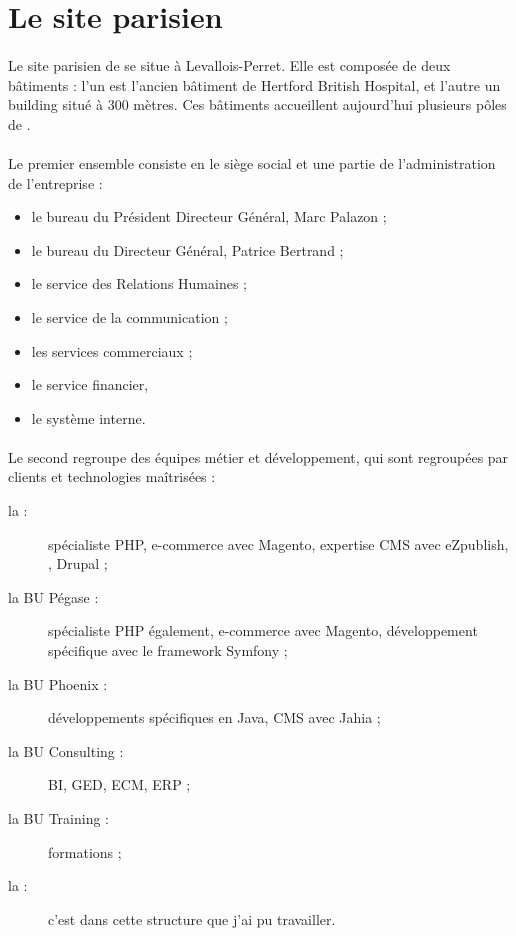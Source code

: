 \section{Le site parisien}

\paragraph{}
Le site parisien de \asmile{} se situe à Levallois-Perret.
Elle est composée de deux bâtiments : l'un est l'ancien bâtiment de Hertford British Hospital, et l'autre un building situé à 300 mètres.
Ces bâtiments accueillent aujourd'hui plusieurs pôles de \asmile{}.

\paragraph{}
Le premier ensemble consiste en le siège social et une partie de l'administration de l'entreprise :

\begin{itemize}
	\item le bureau du Président Directeur Général, Marc Palazon ;
	\item le bureau du Directeur Général, Patrice Bertrand ;
	\item le service des Relations Humaines ;
	\item le service de la communication ;
	\item les services commerciaux ;
	\item le service financier,
	\item le système interne.
\end{itemize}

\paragraph{}
Le second regroupe des équipes métier et développement, qui sont regroupées par clients et technologies maîtrisées :

\begin{description}
	\item[la \abugan{} :] spécialiste PHP, e-commerce avec Magento, expertise CMS avec eZpublish, \atypo{}, Drupal ;
	\item[la BU Pégase :] spécialiste PHP également, e-commerce avec Magento, développement spécifique avec le framework Symfony ;
	\item[la BU Phoenix :] développements spécifiques en Java, CMS avec Jahia ;
	\item[la BU Consulting :] BI, GED, ECM, ERP ;
	\item[la BU Training :] formations ;
	\item[la \abusys{} :] c'est dans cette structure que j'ai pu travailler.
\end{description}


